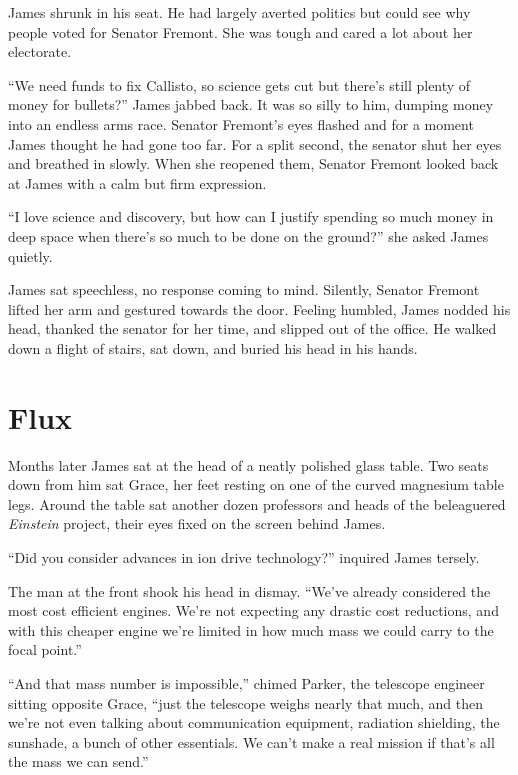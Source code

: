 \documentclass[openany, 12pt]{book} %
\begin{document}
James shrunk in his seat. He had largely averted politics but could see why people voted for Senator Fremont. She was tough and cared a lot about her electorate. 

``We need funds to fix Callisto, so science gets cut but there's still plenty of money for bullets?'' James jabbed back. It was so silly to him, dumping money into an endless arms race. Senator Fremont's eyes flashed and for a moment James thought he had gone too far. For a split second, the senator shut her eyes and breathed in slowly. When she reopened them, Senator Fremont looked back at James with a calm but firm expression.

``I love science and discovery, but how can I justify spending so much money in deep space when there's so much to be done on the ground?'' she asked James quietly.

James sat speechless, no response coming to mind. Silently, Senator Fremont lifted her arm and gestured towards the door. Feeling humbled, James nodded his head, thanked the senator for her time, and slipped out of the office. He walked down a flight of stairs, sat down, and buried his head in his hands.

\chapter{Flux}

Months later James sat at the head of a neatly polished glass table. Two seats down from him sat Grace, her feet resting on one of the curved magnesium table legs. Around the table sat another dozen professors and heads of the beleaguered \textit{Einstein} project, their eyes fixed on the screen behind James.

``Did you consider advances in ion drive technology?'' inquired James tersely.

The man at the front shook his head in dismay. ``We've already considered the most cost efficient engines. We're not expecting any drastic cost reductions, and with this cheaper engine we're limited in how much mass we could carry to the focal point.''

``And that mass number is impossible,'' chimed Parker, the telescope engineer sitting opposite Grace, ``just the telescope weighs nearly that much, and then we're not even talking about communication equipment, radiation shielding, the sunshade, a bunch of other essentials. We can't make a real mission if that's all the mass we can send.''
\end{document}
